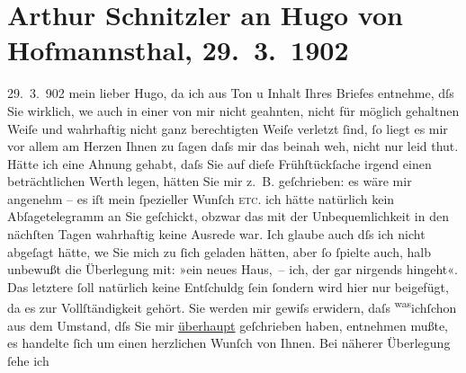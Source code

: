 

               \section[Arthur Schnitzler an Hugo von Hofmannsthal, 29. 3. 1902]{ Arthur Schnitzler an Hugo von Hofmannsthal, 29. 3. 1902}\nopagebreak{}\rehead{ }\normalsize\beginnumbering{} \toendnotes[C]{\smallbreak\pagebreak[2]} 
\pstart
           \raggedleft{}{\pb}29. 3. 902\pend
           \pstart
           mein lieber Hugo, da ich aus Ton u Inhalt Ihres Briefes entnehme,
               dſs Sie wirklich, we{\geminationn} auch in einer von mir nicht
               geahnten, nicht für möglich gehaltnen Weiſe und wahrhaftig nicht ganz berechtigten
               Weiſe verletzt ſind, ſo liegt es mir vor {\pb}allem am Herzen
               Ihnen zu ſagen daſs mir das beinah weh, nicht \introOben{}nur\introOben{} leid thut.
               Hätte ich eine Ahnung gehabt, daſs Sie auf dieſe Frühſtückſache irgend einen
               beträchtlichen Werth legen, hätten Sie mir z. B. geſchrieben: es wäre mir angenehm –
                  {\pb}es iſt mein ſpezieller Wunſch \textsc{etc}. ich hätte natürlich kein Abſagetelegramm an Sie geſchickt, obzwar das
               mit der Unbequemlichkeit in den nächſten Tagen wahrhaftig keine Ausrede war. Ich
               glaube auch dſs ich nicht abgeſagt hätte, we{\geminationn} Sie mich
               zu {\pb}ſich geladen hätten, aber ſo ſpielte auch, halb
               unbewußt die Überlegung mit: »ein neues Haus, – ich, der gar nirgends hingeht«. Das
               letztere ſoll natürlich keine Entſchuldg ſein ſondern \strikeout{\textcolor{gray}{aus}} wird hier nur beigefügt, da es zur Vollſtändigkeit gehört. {\pb}Sie werden mir gewiſs erwidern, daſs \substVorne{}\textsuperscript{was}\substDazwischen{}ich\substHinten{}{ }ſchon aus dem Umstand, dſs Sie mir \uline{überhaupt} geſchrieben haben, entnehmen mußte, es
               handelte ſich um einen herzlichen Wunſch von Ihnen. Bei näherer Überlegung ſehe ich
